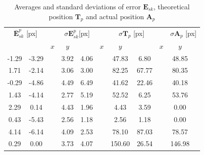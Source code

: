\documentclass[a4paper, 10 pt, conference]{ieeeconf}      %
\begin{document}
\begin{table}[h!]
	\centering
	\caption{Averages and standard deviations of error $\mathbf{E}_{sk}$, theoretical position $\mathbf{T}_p$ and actual position $\mathbf{A}_p$}
	\label{tab:dev}
	\begin{adjustbox}{max width=\columnwidth}
		\begin{tabular}{@{}ccccclccccc@{}}
			\toprule
			\multicolumn{2}{c}{$\overline{\mathbf{E}}^p_{sk}$ [px]} &  & \multicolumn{2}{c}{$\sigma{\mathbf{E}}^p_{sk}$[px]} &  & \multicolumn{2}{c}{$\sigma\mathbf{T}_p$ {[px]}} &  & \multicolumn{2}{c}{$\sigma\mathbf{A}_p$ {[px]}} \\ \cmidrule(r){1-2} \cmidrule(lr){4-5} \cmidrule(lr){7-8} \cmidrule(l){10-11} 
			& & 		        $x$                        & $y$                  &  & $x$                      & $y$                   &  & $x$                     & $y$ \\ \midrule
			-1.29                   & -3.29                  &  & 3.92                  & 4.06                  &  & 47.83                  & 6.80                  &  & 48.85 \\
			1.71                    & -2.14                  &  & 3.06                  & 3.00                  &  & 82.25                  & 67.77                 &  & 80.35 \\
			-0.29                   & -4.86                  &  & 4.49                  & 6.49                  &  & 41.62                  & 22.46                 &  & 40.18 \\
			1.43                    & -4.14                  &  & 2.77                  & 5.19                  &  & 52.52                  & 6.25                   &  & 53.76 \\
			2.29                    & 0.14                   &  & 4.43                  & 1.96                  &  & 4.43                    & 3.59                   &  & 0.00 \\
			0.43                    & -5.43                  &  & 2.56                  & 1.18                  &  & 2.56                    & 1.18                   &  & 0.00 \\
			4.14                    & -6.14                  &  & 4.09                  & 2.53                  &  & 78.10                  & 87.03                 &  & 78.57  \\
			0.29                    & 0.00                   &  & 3.73                  & 4.07                  &  & 150.60                & 26.54                 &  & 146.98 \\

\end{tabular}
\end{adjustbox}
\end{table}
\end{document}
